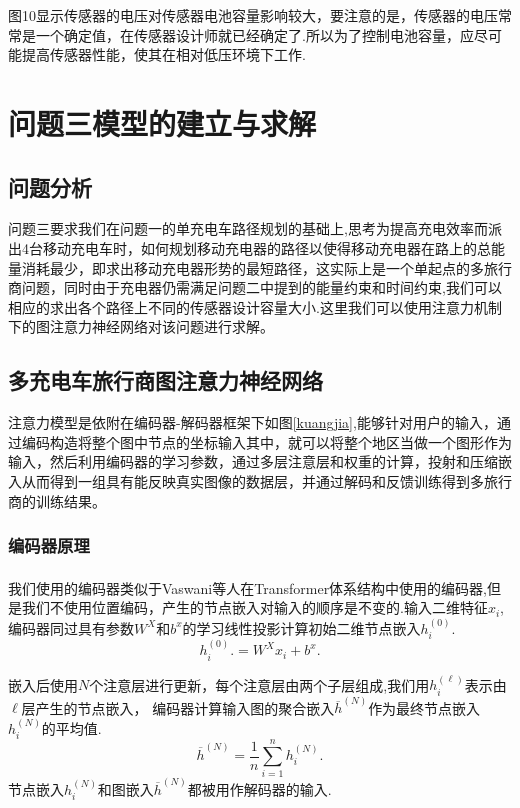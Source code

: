 \documentclass{whutmod}
\newcommand{\upcite}[1]{\textsuperscript{\textsuperscript{\cite{#1}}}}
\begin{document}
图10显示传感器的电压对传感器电池容量影响较大，要注意的是，传感器的电压常常是一个确定值，在传感器设计师就已经确定了.所以为了控制电池容量，应尽可能提高传感器性能，使其在相对低压环境下工作.


\section{问题三模型的建立与求解}
\subsection{问题分析}
问题三要求我们在问题一的单充电车路径规划的基础上,思考为提高充电效率而派出4台移动充电车时，如何规划移动充电器的路径以使得移动充电器在路上的总能量消耗最少，即求出移动充电器形势的最短路径，这实际上是一个单起点的多旅行商问题，同时由于充电器仍需满足问题二中提到的能量约束和时间约束,我们可以相应的求出各个路径上不同的传感器设计容量大小.这里我们可以使用注意力机制下的图注意力神经网络对该问题进行求解。

\subsection{多充电车旅行商图注意力神经网络}
注意力模型是依附在编码器-解码器框架下如图\ref{kuangjia},能够针对用户的输入，通过编码构造将整个图中节点的坐标输入其中，就可以将整个地区当做一个图形作为输入，然后利用编码器的学习参数，通过多层注意层和权重的计算，投射和压缩嵌入从而得到一组具有能反映真实图像的数据层，并通过解码和反馈训练得到多旅行商的训练结果。

\subsubsection{编码器原理}
我们使用的编码器类似于Vaswani\upcite{bib:four}等人在Transformer体系结构中使用的编码器,但是我们不使用位置编码，产生的节点嵌入对输入的顺序是不变的.输入二维特征$x_{i}$,编码器同过具有参数$W^{X}$和$b^{x}$的学习线性投影计算初始二维节点嵌入$h_{i}^{(0)}$.
\begin{equation}
h_{i}^{(0)}.=W^{X}x_{i}+b^{x}.
\end{equation}

 嵌入后使用$N$个注意层进行更新，每个注意层由两个子层组成,我们用$h_{i}^{(\ell )}$表示由$\ell$层产生的节点嵌入， 编码器计算输入图的聚合嵌入$\overline h^{(N)}$作为最终节点嵌入$h_{i}^{(N)}$的平均值.
\begin{equation}
\overline h^{(N)}=\frac{1}{n}\sum_{i=1}^{n}h_{i}^{(N)}.
\end{equation}
节点嵌入$h_{i}^{(N)}$和图嵌入$\overline h^{(N)}$都被用作解码器的输入.
\end{document}
